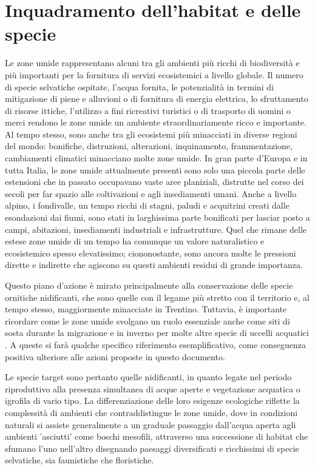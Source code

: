 \documentclass[10pt,twoside,openany,x11names,svgnames,italian,a5paper,dvipsnames,table]{memoir}
\begin{document}
\section{Inquadramento dell'habitat e delle specie}
Le zone umide rappresentano alcuni tra gli ambienti più ricchi di biodiversità e più importanti per la fornitura di servizi ecosistemici a livello globale. Il numero di specie selvatiche ospitate, l'acqua fornita, le potenzialità in termini di mitigazione di piene e alluvioni o di fornitura di energia elettrica, lo sfruttamento di risorse ittiche, l'utilizzo a fini ricreativi turistici o di trasporto di uomini o merci rendono le zone umide un ambiente straordinariamente ricco e importante. Al tempo stesso, sono anche tra gli ecosistemi più minacciati in diverse regioni del mondo: bonifiche, distruzioni, alterazioni, inquinamento, frammentazione, cambiamenti climatici minacciano molte zone umide.
In gran parte d'Europa e in tutta Italia, le zone umide attualmente presenti sono solo una piccola parte delle estensioni che in passato occupavano vaste aree planiziali, distrutte nel corso dei secoli per far spazio alle coltivazioni e agli insediamenti umani. Anche a livello alpino, i fondivalle, un tempo ricchi di stagni, paludi e acquitrini creati dalle esondazioni dai fiumi, sono stati in larghissima parte bonificati per lasciar posto a campi, abitazioni, insediamenti industriali e infrastrutture. Quel che rimane delle estese zone umide di un tempo ha comunque un valore naturalistico e ecosistemico spesso elevatissimo; ciononostante, sono ancora molte le pressioni dirette e indirette che agiscono su questi ambienti residui di grande importanza.

Questo piano d'azione è mirato principalmente alla conservazione delle specie ornitiche nidificanti, che sono quelle con il legame più stretto con il territorio e, al tempo stesso, maggiormente minacciate in Trentino. Tuttavia, è importante ricordare come le zone umide svolgano un ruolo essenziale anche come siti di sosta durante la migrazione e in inverno per molte altre specie di uccelli acquatici \cite{Pedrini05}. A queste si farà qualche specifico riferimento esemplificativo, come conseguenza positiva ulteriore alle azioni proposte in questo documento.

Le specie target sono pertanto quelle nidificanti, in quanto legate nel periodo riproduttivo alla presenza simultanea di acque aperte e vegetazione acquatica o igrofila di vario tipo. La differenziazione delle loro esigenze ecologiche riflette la complessità di ambienti che contraddistingue le zone umide, dove in condizioni naturali si assiste generalmente a un graduale passaggio dall'acqua aperta agli ambienti 'asciutti' come boschi mesofili, attraverso una successione di habitat che sfumano l'uno nell'altro disegnando paesaggi diversificati e ricchissimi di specie selvatiche, sia faunistiche che floristiche.
\end{document}
